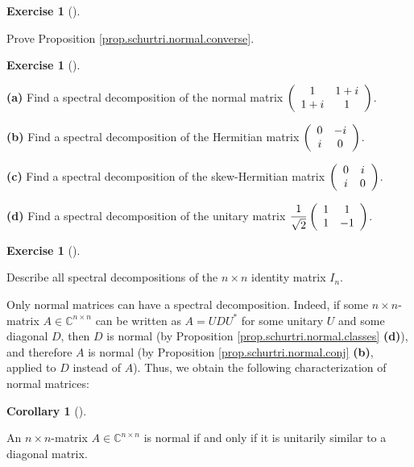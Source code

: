 \documentclass[numbers=enddot,12pt,final,onecolumn,notitlepage]{scrartcl}%
\newcounter{exer}
\numberwithin{exer}{subsection}
\theoremstyle{definition}
\newtheorem{coro}[theo]{Corollary}
\newenvironment{corollary}[1][]
{\begin{coro}[#1]\begin{leftbar}}
{\end{leftbar}\end{coro}}
\newtheorem{exmp}[exer]{Exercise}
\newenvironment{exercise}[1][]
{\begin{exmp}[#1]\begin{leftbar}}
{\end{leftbar}\end{exmp}}
\begin{document}
\begin{exercise}
 Prove Proposition \ref{prop.schurtri.normal.converse}.
\end{exercise}

\begin{exercise}
\label{exe.schurtri.normal.examples} \textbf{(a)} Find a spectral
decomposition of the normal matrix $\left(
\begin{array}
[c]{cc}%
1 & 1+i\\
1+i & 1
\end{array}
\right)  $. \medskip

\textbf{(b)} Find a spectral decomposition of the Hermitian matrix $\left(
\begin{array}
[c]{cc}%
0 & -i\\
i & 0
\end{array}
\right)  $. \medskip

\textbf{(c)} Find a spectral decomposition of the skew-Hermitian matrix
$\left(
\begin{array}
[c]{cc}%
0 & i\\
i & 0
\end{array}
\right)  $. \medskip

\textbf{(d)} Find a spectral decomposition of the unitary matrix $\dfrac
{1}{\sqrt{2}}\left(
\begin{array}
[c]{cc}%
1 & 1\\
1 & -1
\end{array}
\right)  $.
\end{exercise}

\begin{exercise}
 Describe all spectral decompositions of the $n\times n$ identity
matrix $I_{n}$.
\end{exercise}

Only normal matrices can have a spectral decomposition. Indeed, if some
$n\times n$-matrix $A\in\mathbb{C}^{n\times n}$ can be written as
$A=UDU^{\ast}$ for some unitary $U$ and some diagonal $D$, then $D$ is normal
(by Proposition \ref{prop.schurtri.normal.classes} \textbf{(d)}), and
therefore $A$ is normal (by Proposition \ref{prop.schurtri.normal.conj}
\textbf{(b)}, applied to $D$ instead of $A$). Thus, we obtain the following
characterization of normal matrices:

\begin{corollary}
\label{cor.schurtri.normal.normal-iff}An $n\times n$-matrix $A\in
\mathbb{C}^{n\times n}$ is normal if and only if it is unitarily similar to a
diagonal matrix.
\end{corollary}
\end{document}

